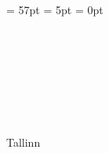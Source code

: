 
\begin{titlepage}
\headheight = 57pt
\footskip = 5pt
\headsep = 0pt

\centering
\university\\
\school

\vspace*{4.5 cm}

\begin{center}

\authorName~~\studentcode\\
\vspace*{1.5 cm}

\begin{Large}

\textsc{\textbf{\doctitle}}\\
\end{Large}

\vspace*{1.5 cm}
\doctype\\
\end{center}

\vspace*{0.6 cm}

\vspace*{0.2 cm}

\vfill

Tallinn \Year
\end{titlepage}

\pagebreak

